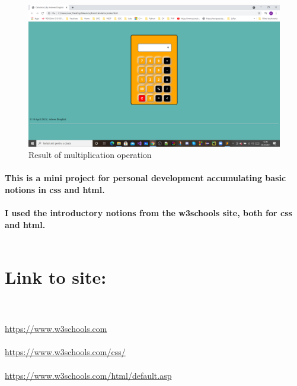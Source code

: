 \documentclass{article}
\begin{document}
\vspace{1.5cm}
\begin{figure}[h]
    \centering
    \includegraphics[width=15cm]{rezultat.png}
    \caption{Result of multiplication operation}
    \label{inmultire.png}
\end{figure}
\newpage
\paragraph{This is a mini project for personal development accumulating basic notions in css and html.\\\\
I used the introductory notions from the w3schools site, both for css and html.\\\\}
\section{Link to site:\\\\}
\url{https://www.w3schools.com}\\\\
\url{https://www.w3schools.com/css/}\\\\
\url{https://www.w3schools.com/html/default.asp }
\end{document}
